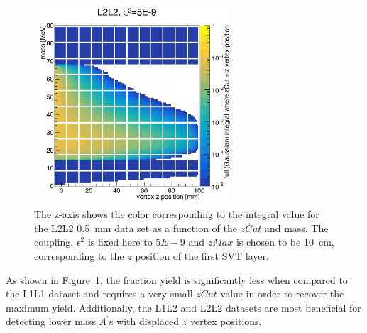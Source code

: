 \begin{figure}[htb]
  \centering
      \includegraphics[width=0.65\textwidth]{pics/searching/integralEff22.png}
  \caption[Integral as a function of mass and $zCut$ for L2L2]{The z-axis shows the color corresponding to the integral value for the L2L2 0.5~mm data set as a function of the $zCut$ and mass. The coupling, $\epsilon^2$ is fixed here to $5E-9$ and $zMax$ is chosen to be 10~cm, corresponding to the $z$ position of the first SVT layer. }
  \label{fig:effIntegral22}
\end{figure}

As shown in Figure~\ref{fig:effIntegral22}, the fraction yield is significantly less when compared to the L1L1 dataset and requires a very small $zCut$ value in order to recover the maximum yield. Additionally, the L1L2 and L2L2 datasets are most beneficial for detecting lower mass $A^{\prime}$s with displaced $z$ vertex positions. 